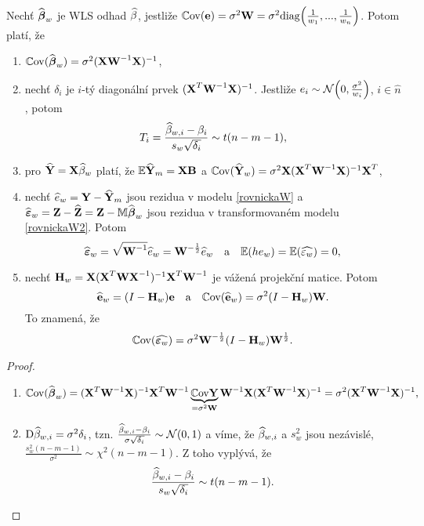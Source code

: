 \begin{theorem}
Nechť $\widehat{\boldsymbol{\beta}}_w$ je WLS odhad $\widehat{\beta}$, jestliže $\mathbb{C}\mathrm{ov}(\textbf{e})=\sigma^2\textbf{W}=\sigma^2\mathrm{diag}\Big(\frac{1}{w_1},...,\frac{1}{w_n}\Big)$. Potom platí, že\begin{enumerate}[1)]
	\item $\mathbb{C}\mathrm{ov}(\widehat{\boldsymbol{\beta}}_w)=\sigma^2{(\textbf{X}{\textbf{W}^{-1}}\textbf{X})^{-1}}$,
	\item nechť $\delta_i$ je $i$-tý diagonální prvek ${(\textbf{X}^T{\textbf{W}^{-1}}\textbf{X})^{-1}}$. Jestliže $e_i\sim \mathcal{N}\Big(0,\frac{\sigma^2}{w_i}\Big)$, $i\in\hat{n}$, potom 
	$$ T_i=\frac{\widehat{\beta}_{w,i}-\beta_i}{s_w\sqrt{\delta_i}}\sim t(n-m-1),$$
	\item pro $\widehat{\textbf{Y}}=\textbf{X}\widehat{\beta}_w$ platí, že $\mathbb{E} \widehat{\textbf{Y}}_m=\textbf{X}\textbf{B}$ a $\mathbb{C}\mathrm{ov}(\widehat{\textbf{Y}}_w)=\sigma^2\textbf{X}{(\textbf{X}^T{\textbf{W}^{-1}}\textbf{X})^{-1}}\textbf{X}^T$,
\item nechť $\widehat{e}_w=\textbf{Y}-\widehat{\textbf{Y}}_m$ jsou rezidua v modelu \ref{rovnickaW} a $\widehat{\boldsymbol{\varepsilon}}_w=\textbf{Z}-\widehat{\textbf{Z}}=\textbf{Z}-\mathbb{M}\widehat{\boldsymbol{\beta}}_w$ jsou rezidua v transformovaném modelu \ref{rovnickaW2}. Potom
$$ \widehat{\boldsymbol{\varepsilon}}_w=\sqrt{{\textbf{W}^{-1}}}\widehat{e}_w=\textbf{W}^{-\frac{1}{2}}\widehat{e}_w\quad\text{a}\quad \mathbb{E}(he_w)=\mathbb{E}(\widehat{\varepsilon_w})=0,$$
\item nechť $\textbf{H}_w=\textbf{X}{(\textbf{X}^T{\textbf{W}\textbf{X}^{-1}})^{-1}}\textbf{X}^T{\textbf{W}^{-1}}$ je vážená projekční matice. Potom
$$ \widehat{\textbf{e}}_w=(I-\textbf{H}_w)\textbf{e}\quad\text{a}\quad \mathbb{C}\mathrm{ov}(\widehat{\textbf{e}}_w)=\sigma^2(I-\textbf{H}_w)\textbf{W}.$$
To znamená, že $$ \mathbb{C}\mathrm{ov}(\widehat{\boldsymbol{\varepsilon}_w})=\sigma^2\textbf{W}^{-\frac{1}{2}}(I-\textbf{H}_w)\textbf{W}^{\frac{1}{2}}.$$
	\end{enumerate}
\begin{proof}
	\begin{enumerate}[1)]
		\item $$\mathbb{C}\mathrm{ov} (\widehat{\boldsymbol{\beta}}_w)={(\textbf{X}^T{\textbf{W}^{-1}}\textbf{X})^{-1}}\textbf{X}^T{\textbf{W}^{-1}}\underbrace{\mathbb{C}\mathrm{ov} \textbf{Y}}_{=\sigma^2\textbf{W}}{\textbf{W}^{-1}}\textbf{X}{(\textbf{X}^T{\textbf{W}^{-1}}\textbf{X})^{-1}}=\sigma^2{(\textbf{X}^T{\textbf{W}^{-1}}\textbf{X})^{-1}},$$
		\item $\mathrm{D} \widehat{\beta}_{w,i}=\sigma^2\delta_i$, tzn. $\frac{\widehat{\beta}_{w,i}-\beta_i}{\sigma\sqrt{\delta_i}}\sim\mathcal{N}(0,1)$ a víme, že $\widehat{\beta}_{w,i}$ a $s_w^2$ jsou nezávislé, $\frac{s_w^2(n-m-1)}{\sigma^2}\sim\chi^2(n-m-1)$. Z toho vyplývá, že 
		$$ \frac{\widehat{\beta}_{w,i}-\beta_i}{s_w\sqrt{\delta_i}}\sim t(n-m-1).$$

\end{enumerate}
\end{proof}
\end{theorem}
